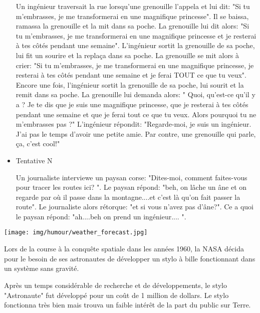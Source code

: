 \begin{itemize}
	Un ingénieur traversait la rue lorsqu'une grenouille l'appela et lui dit: "Si tu m'embrasses, je me transformerai en une magnifique princesse". Il se baissa, ramassa la grenouille et la mit dans sa poche. La grenouille lui dit alors: "Si tu m'embrasses, je me transformerai en une magnifique princesse et je resterai à tes côtés pendant une semaine". L'ingénieur sortit la grenouille de sa poche, lui fit un sourire et la replaça dans sa poche. La grenouille se mit alors à crier: "Si tu m'embrasses, je me transformerai en une magnifique princesse, je resterai à tes côtés pendant une semaine et je ferai TOUT ce que tu veux". Encore une fois, l'ingénieur sortit la grenouille de sa poche, lui sourit et la remit dans sa poche. La grenouille lui demanda alors: " Quoi, qu'est-ce qu'il y a ? Je te dis que je suis une magnifique princesse, que je resterai à tes côtés pendant une semaine et que je ferai tout ce que tu veux. Alors pourquoi tu ne m'embrasses pas ?" L'ingénieur répondit: "Regarde-moi, je suis un ingénieur. J'ai pas le temps d'avoir une petite amie. Par contre, une grenouille qui parle, ça, c'est cool!"

	\item Tentative N 

	Un journaliste interviewe un paysan corse: "Dites-moi, comment faites-vous pour tracer les routes ici? ". Le paysan répond: "beh, on lâche un âne et on regarde par où il passe dans la montagne....et c'est là qu'on fait passer la route". Le journaliste alors rétorque: "et si vous n'avez pas d'âne?". Ce a quoi le paysan répond: "ah....beh on prend un ingénieur.... ".
\end{itemize}

	\begin{center}\underline{\hspace{5 cm}}\end{center}
	
	\begin{center}
	\texttt{[image: img/humour/weather\_forecast.jpg]}
	\end{center}
		
	Lors de la course à la conquête spatiale dans les années 1960, la NASA décida pour le besoin de ses astronautes de développer un stylo à bille fonctionnant dans un système sans gravité.

	Après un temps considérable de recherche et de développements, le stylo "Astronaute" fut développé pour un coût de 1 million de dollars. Le stylo fonctionna très bien mais trouva un faible intérêt de la part du public sur Terre.

